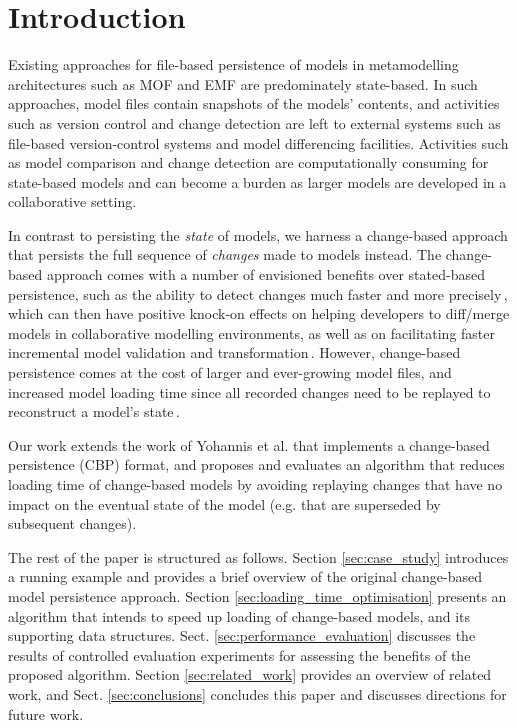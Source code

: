 \documentclass{llncs}
\begin{document}
\section{Introduction}
\label{sec:introduction}
Existing approaches for file-based persistence of models in metamodelling architectures such as MOF and EMF are predominately state-based.
In such approaches, model files contain snapshots of the models' contents, and activities such as version control and change detection are left to external systems such as file-based version-control systems and model differencing facilities.
Activities such as model comparison and change detection are computationally consuming for state-based models and can become a burden as larger models are developed in a collaborative setting. 

In contrast to persisting the \emph{state} of models, we harness a change-based approach that persists the full sequence of \emph{changes} made to models instead.
The change-based approach comes with a number of envisioned benefits over stated-based persistence, such as the ability to detect changes much faster and more precisely\,\cite{yohannis2017turning}, which can then have positive knock-on effects on helping developers to diff/merge models in collaborative modelling environments, as well as on facilitating faster incremental model validation and transformation\,\cite{rath2012derived,ogunyomi2015property}.
However, change-based persistence comes at the cost of larger and ever-growing model files, and increased model loading time since all recorded changes need to be replayed to reconstruct a model's state\,\cite{yohannis2017turning}.   

Our work extends the work of Yohannis et al. \cite{yohannis2017turning} that implements a change-based persistence (CBP) format, and proposes and evaluates an algorithm that reduces loading time of change-based models by avoiding replaying changes that have no impact on the eventual state of the model (e.g. that are superseded by subsequent changes).

The rest of the paper is structured as follows. Section \ref{sec:case_study} introduces a running example and provides a brief overview of the original change-based model persistence approach.
Section \ref{sec:loading_time_optimisation} presents an algorithm that intends to speed up loading of change-based models, and its supporting data structures. %
Sect. \ref{sec:performance_evaluation} discusses the results of controlled evaluation experiments for assessing the benefits of the proposed algorithm. Section \ref{sec:related_work} provides an overview of related work, and Sect. \ref{sec:conclusions} concludes this paper and discusses directions for future work.
\end{document}
